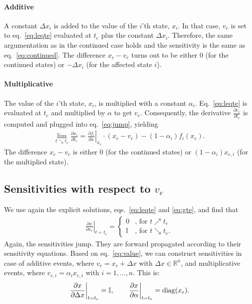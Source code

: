\documentclass[journal, a4paper]{IEEEtran}
\begin{document}
\paragraph{Additive} 
A constant $\Delta x_i$ is added to the value of the $i$'th state, $x_i$. In that case, $v_e$ is set to eq.~\eqref{eq:leqte} evaluated at $t_e$ plus the constant $\Delta x_i$. Therefore, the same argumentation as in the continued case holds and the sensitivity is the same as eq.~\eqref{eq:continued}. The difference $x_e - v_e$ turns out to be either 0 (for the continued states) or $-\Delta x_i$ (for the affected state $i$).\\

\paragraph{Multiplicative}
The value of the $i$'th state, $x_i$, is multiplied with a constant $\alpha_i$. Eq.~\eqref{eq:leqte} is evaluated at $t_e$ and multiplied by $\alpha$ to get $v_e$. Consequently, the derivative $\frac{\partial v_e}{\partial t_e}$ is computed and plugged into eq.~\eqref{eq:jump}, yielding
\begin{align}
    \lim_{t\searrow t_e}\frac{\partial x_i}{\partial t_e} = \left.\frac{\partial f_i}{\partial x}\right|_{x_e}\cdot (x_e - v_e) - (1-\alpha_i)f_i(x_e).
\end{align}
The difference $x_e - v_e$ is either 0 (for the continued states) or $(1-\alpha_i)x_{e, i}$ (for the multiplied state).

\subsection{Sensitivities with respect to $v_e$}

We use again the explicit solutions, eqs.~\eqref{eq:leqte} and \eqref{eq:gte}, and find that
\begin{align}
    \left.\frac{\partial x}{\partial v_e}\right|_{t = t_e} =
    \left\{
    \begin{array}{ll}
    0     & \textrm{, for } t\nearrow t_e \\
    \mathbb I     & \textrm{, for }t \searrow t_e.
    \end{array}
    \right.
    \label{eq:value}
\end{align}
Again, the sensitivities jump. They are forward propagated according to their sensitivity equations. Based on eq.~\eqref{eq:value}, we can construct sensitivities in case of additive events, where $v_e = x_e + \Delta x$ with $\Delta x \in \mathbb R^n$, and multiplicative events, where $v_{e, i} = \alpha_i x_{e, i}$ with $i = 1, \dots, n$. This is:
\begin{align}
    \left.\frac{\partial x}{\partial \Delta x}\right|_{t = t_e} = \mathbb I, \qquad \left.\frac{\partial x}{\partial \alpha}\right|_{t = t_e} = {\rm diag}(x_e).
\end{align}
\end{document}
